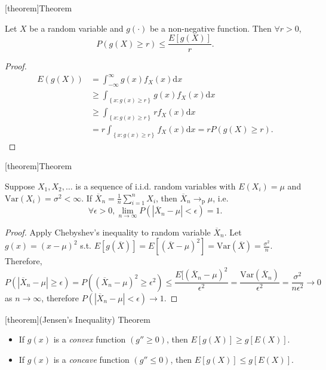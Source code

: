\documentclass[12pt]{report}
\theoremstyle{definition}
\begin{document}
[theorem]{Theorem}
\begin{Chebyshev's Inequality}
    Let $X$ be a random variable and $g(\cdot)$ be a non-negative function.
    Then $\forall r>0$,
    \[
        P(g(X)\ge r)\le \frac{E[g(X)]}{r}.
    \]
\end{Chebyshev's Inequality}
\begin{proof}
    \begin{align*}
        E(g(X))
        & =\int_{-\infty}^{\infty} g(x)f_X(x)\mathrm{d}x \\
        & \ge \int_{\left\{x:g(x)\ge r\right\}}g(x)f_X(x)\mathrm{d}x \\
        & \ge \int_{\left\{x:g(x)\ge r\right\}}rf_X(x)\mathrm{d}x \\
        & =r\int_{\left\{x:g(x)\ge r\right\}}f_X(x)\mathrm{d}x =rP(g(X)\ge r).
    \end{align*} 
\end{proof} 

[theorem]{Theorem}
\begin{weak law of large numbers}
    Suppose $X_1,X_2,\ldots$ is a sequence of i.i.d. random variables with
    $E(X_i)=\mu$ and $\text{Var}(X_i)=\sigma^2<\infty$. If
    $\overline{X}_n=\frac{1}{n}\sum_{i=1}^{n} X_i$, then
    $\overline{X}_n\rightarrow_\text{p}\mu$, i.e.\
    \[
        \forall\epsilon>0,\lim_{n\rightarrow\infty}P(|\overline{X}_n-\mu|<\epsilon)=1.
    \]
\end{weak law of large numbers}
\begin{proof}
    Apply Chebyshev's inequality to random variable $\overline{X}_n$.
    Let $g(x)={(x-\mu)}^{2}$ s.t.
    $E[g(\overline{X})]=E[{(\overline{X}-\mu)}^{2}]=\text{Var}(\overline{X})=\frac{\sigma^2}{n}$.
    Therefore,
    \[
        P(|\overline{X}_n-\mu|\ge\epsilon)
        =P({(\overline{X}_n-\mu)}^{2}\ge\epsilon^2)
        \le \frac{E[{(\overline{X}_n-\mu)}^{2}}{\epsilon^2}
        =\frac{\text{Var}(\overline{X}_n)}{\epsilon^2}
        =\frac{\sigma^2}{n\epsilon^2}\longrightarrow 0
    \]
    as $n\rightarrow\infty$, therefore
    $
        P(|\overline{X}_n-\mu|<\epsilon)\longrightarrow 1.
    $
\end{proof} 

[theorem]{(Jensen's Inequality) Theorem}
\begin{Jensen's inequality}
    \quad
    \begin{itemize}
        \item If $g(x)$ is a \emph{convex} function $(g''\ge 0)$, then $E[g(X)]\ge
            g[E(X)]$.
        \item If $g(x)$ is a \emph{concave} function $(g''\le 0)$, then $E[g(X)]\le
            g[E(X)]$.
    \end{itemize} 
\end{Jensen's inequality}
\end{document}
